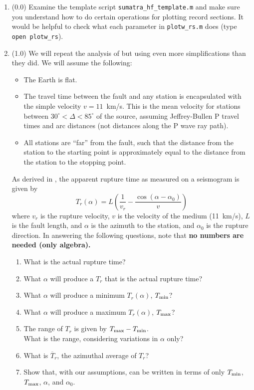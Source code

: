 \documentclass[11pt,titlepage,fleqn]{article}
\begin{document}
\begin{enumerate}
\item (0.0) Examine the template script \verb+sumatra_hf_template.m+ and make sure you understand how to do certain operations for plotting record sections. It would be helpful to check what each parameter in \verb+plotw_rs.m+ does (type \verb+open plotw_rs+).

\item (1.0) We will repeat the analysis of \citet{Ni2005} but using even more simplifications than they did. We will assume the following:
%
\begin{itemize}
\item The Earth is flat.
\item The travel time between the fault and any station is encapsulated with the simple velocity $v = 11$~km/s. This is the mean velocity for stations between $30^\circ < \Delta < 85^\circ$ of the source, assuming Jeffrey-Bullen P travel times and arc distances (not distances along the P wave ray path).
\item All stations are ``far'' from the fault, such that the distance from the station to the starting point is approximately equal to the distance from the station to the stopping point.
\end{itemize}
%
As derived in \citet[][Section 4.3.2]{SteinWysession}, the apparent rupture time as measured on a seismogram is given by
%
\begin{equation}
T_r(\alpha) = L\left(\frac{1}{v_r} - \frac{\cos(\alpha-\alpha_0)}{v}\right)
\label{Tr}
\end{equation}
%
where $v_r$ is the rupture velocity, $v$ is the velocity of the medium (11~km/s), $L$ is the fault length, and $\alpha$ is the azimuth to the station, and $\alpha_0$ is the rupture direction. In answering the following questions, note that {\bf no numbers are needed (only algebra).}
%
\begin{enumerate}
\item What is the actual rupture time?
\item What $\alpha$ will produce a $T_r$ that is the actual rupture time?
\item What $\alpha$ will produce a minimum $T_r(\alpha)$, $T_{\rm min}$?
\item What $\alpha$ will produce a maximum $T_r(\alpha)$, $T_{\rm max}$?
\item The range of $T_r$ is given by $T_{\rm max} - T_{\rm min}$. \\
What is the range, considering variations in $\alpha$ only?
\item What is $\overline{T}_r$, the azimuthal average of $T_r$?
\item Show that, with our assumptions,  can be written in terms of only $T_{\rm min}$, $T_{\rm max}$, $\alpha$, and $\alpha_0$.


\end{enumerate}
\end{enumerate}
\end{document}
